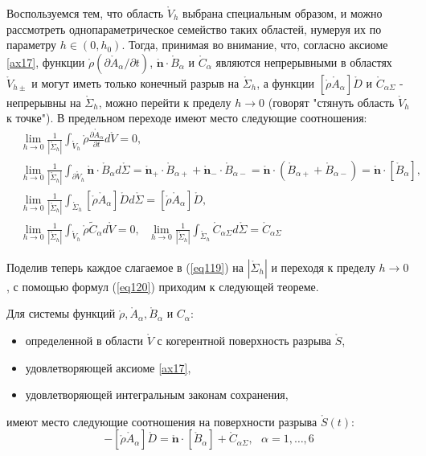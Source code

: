Воспользуемся тем, что область $\mathring{V}_h$ выбрана специальным образом, и можно рассмотреть однопараметрическое семейство таких областей, нумеруя их по параметру $h \in (0, h_0)$. Тогда, принимая во внимание, что, согласно аксиоме \ref{ax17}, функции $\mathring{\rho}(\partial \mathring{A}_\alpha/\partial t)$, $\mathring{\mathbf{n}}\cdot\mathring{B}_\alpha$ и $\mathring{C}_\alpha$ являются непрерывными в областях $\mathring{V}_{h\pm}$ и могут иметь только конечный разрыв на $\mathring{\Sigma}_h$, а функции $[\mathring{\rho}\mathring{A}_\alpha]\mathring{D}$ и $\mathring{C}_{\alpha\Sigma}$ - непрерывны на $\mathring{\Sigma}_h$, можно перейти к пределу $h\to0$ (говорят "стянуть область $\mathring{V}_h$ к точке"). В предельном переходе имеют место следующие соотношения:
\begin{equation}\label{eq120}
\begin{aligned}
	&\lim_{ h \to 0} \frac{1}{|\mathring{\Sigma}_{h}|}\int_{\mathring{V}_{h}}\mathring{\rho}\frac{\partial \mathring{A}_{\alpha}}{\partial t}d\mathring{V}=0,
	\\
	&\lim_{ h \to 0 }  \frac{1}{|\mathring{\Sigma}_{h}|}\int_{\partial\mathring{V}_{h}}\mathbf{\mathring{n}}\cdot \mathring{B}_{\alpha}d\mathring{\Sigma}=\mathbf{\mathring{n}}_{+}\cdot\mathring{B}_{\alpha+}+\mathbf{\mathring{n}}_{-}\cdot\mathring{B}_{\alpha-}=\mathbf{\mathring{n}}\cdot(\mathring{B}_{\alpha+}+\mathring{B}_{\alpha-})=\mathbf{\mathring{n}}\cdot[\mathring{B}_{\alpha}],
	\\
	&\lim_{ h \to 0} \frac{1}{|\mathring{\Sigma}_{h}|}\int_{\mathring{\Sigma}_{h}}[\mathring{\rho}\mathring{A}_{\alpha}]\mathring{D}d\mathring{\Sigma}=[\mathring{\rho}\mathring{A}_{\alpha}]\mathring{D},\\
	&\lim_{ h \to 0} \frac{1}{|\mathring{\Sigma}_{h}|}\int_{\mathring{V}_{h}}\mathring{\rho}\tilde{C}_{\alpha}d\mathring{V}=0,~~~\lim_{ h \to 0} \frac{1}{|\mathring{\Sigma}_{h}|}\int_{\mathring{\Sigma}_{h}}\mathring{C}_{\alpha\Sigma}d\mathring{\Sigma}=\mathring{C}_{\alpha\Sigma}
\end{aligned}
\end{equation}

Поделив теперь каждое слагаемое в (\ref{eq119}) на $|\mathring{\Sigma}_h|$ и переходя к пределу $h\to 0$, с помощью формул (\ref{eq120}) приходим к следующей теореме.
\begin{theorem}
	Для системы функций $\mathring{\rho},\mathring{A}_{\alpha}, \mathring{B}_\alpha$ и $C_\alpha$:
	\begin{itemize}
		\item определенной в области $\mathring{V}$ с когерентной поверхность разрыва $\mathring{S}$,
		\item удовлетворяющей аксиоме \ref{ax17},
		\item удовлетворяющей интегральным законам сохранения,
	\end{itemize}
	имеют место следующие соотношения на поверхности разрыва $\mathring{S}(t)$:
	\begin{equation}\label{eq125}
		-[\mathring{\rho}\mathring{A}_\alpha]\mathring{D}=\mathring{\mathbf{n}}\cdot[\mathring{B}_\alpha]+\mathring{C}_{\alpha\Sigma},~~~\alpha=1,\dots,6
	\end{equation}
\end{theorem}
